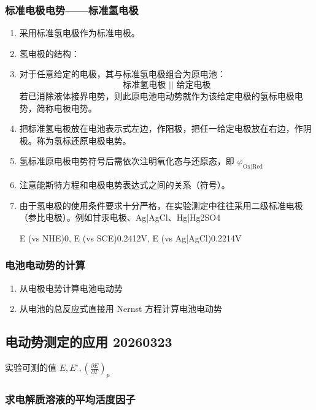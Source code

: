 \subsubsection{标准电极电势——标准氢电极}

\begin{enumerate}
    \item 采用标准氢电极作为标准电极。
    \item 氢电极的结构：
    \item 对于任意给定的电极，其与标准氢电极组合为原电池：
    \begin{equation*}
        \textbf{标准氢电极 || 给定电极}
    \end{equation*}
    若已消除液体接界电势，则此原电池电动势就作为该给定电极的氢标电极电势，简称电极电势。
    \item 把标准氢电极放在电池表示式左边，作阳极，把任一给定电极放在右边，作阴极。称为氢标还原电极电势。
    \item 氢标准原电极电势符号后需依次注明氧化态与还原态，即 $\varphi_{\mathrm{Ox} | \mathrm{Red}}$
    \item 注意能斯特方程和电极电势表达式之间的关系（符号）。
    \item 由于氢电极的使用条件要求十分严格，在实验测定中往往采用二级标准电极（参比电极）。例如甘汞电极、Ag|AgCl、Hg|Hg2SO4
    
    E (vs NHE)0, E (vs SCE)0.2412V, E (vs Ag|AgCl)0.2214V
\end{enumerate}

\subsubsection{电池电动势的计算}

\begin{enumerate}
    \item 从电极电势计算电池电动势
    \item 从电池的总反应式直接用 Nernst 方程计算电池电动势
\end{enumerate}

\subsection{电动势测定的应用 20260323}

实验可测的值 $\displaystyle E, E^{\circ}, (\frac{\partial E}{\partial T})_p$

\subsubsection{求电解质溶液的平均活度因子}

